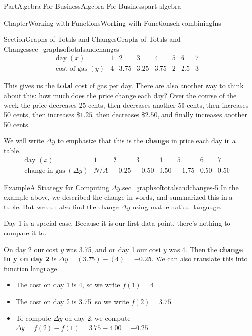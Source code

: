 \documentclass[oneside,10pt,]{tufte-book}
\newcommand{\terminology}[1]{\textbf{#1}}
\numberwithin{equation}{chapter}
\begin{document}
\begin{partptx}{Part}{Algebra For Business}{}{Algebra For Business}{}{}{part-algebra}
\begin{chapterptx}{Chapter}{Working with Functions}{}{Working with Functions}{}{}{ch-combiningfns}
\begin{sectionptx}{Section}{\textasteriskcentered{}Graphs of Totals and Changes}{}{\textasteriskcentered{}Graphs of Totals and Changes}{}{}{sec_graphsoftotalsandchanges}
\begin{equation*}
\begin{array}{c|c|c|c|c|c|c|c}
\text{day }(x)         
&  1 
&  2   
&  3  
&  4  
&  5 
&  6 
&  7  
\\ \hline
\text{cost of gas }(y) 
& 4  
& 3.75
& 3.25
& 3.75
& 2  
& 2.5
& 3
\end{array}
\end{equation*}
%
\par
This gives us the \terminology{total} cost of gas per day. There are also another way to think about this: how much does the price change each day? Over the course of the week the price decreases 25 cents, then decreases another 50 cents, then increases 50 cents, then increases \(\$1.25\), then decreases \(\$2.50\), and finally increases another 50 cents.%
\par
We will write \(\Delta y\) to emphasize that this is the \terminology{change} in price each day in a table.%
\begin{equation*}
\begin{array}{c|c|c|c|c|c|c|c}
\text{day }(x)
&  1 
&  2   
&  3  
&  4  
&  5 
&  6 
&  7  
\\ \hline
\text{change in gas }(\Delta y) 
& N/A  
& -0.25 
& -0.50 
&  0.50 
& -1.75 
&  0.50 
&  0.50
\end{array}
\end{equation*}
%
\begin{example}{Example}{A Strategy for Computing \(\Delta y\).}{sec_graphsoftotalsandchanges-5}%
In the example above, we described the change in words, and summarized this in a table. But we can also find the change \(\Delta y\) using mathematical language.%
\par
Day 1 is a special case. Because it is our first data point, there's nothing to compare it to.%
\par
On day 2 our cost \(y\) was 3.75, and on day 1 our cost \(y\) was 4. Then the \terminology{change in y on day 2} is \(\Delta y = (3.75) - (4) = -0.25\). We can also translate this into function language.%
\begin{itemize}[label=\textbullet]
\item{}The cost on day 1 is \textdollar{}4, so we write \(f(1) = 4\)%
\item{}The cost on day 2 is \textdollar{}3.75, so we write \(f(2) = 3.75\)%
\item{}To compute \(\Delta y\) on day 2, we compute \(\Delta y = f(2)-f(1) = 3.75-4.00=-0.25\)%
\end{itemize}

\end{example}
\end{sectionptx}
\end{chapterptx}
\end{partptx}
\end{document}
